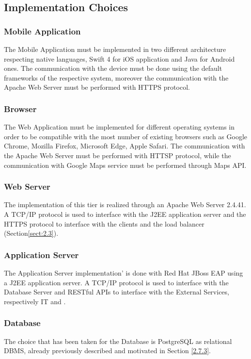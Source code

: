 \documentclass[../DD.tex]{subfiles}
\begin{document}
\subsection{Implementation Choices\label{5.2.2}}

\subsubsection{Mobile Application}
The Mobile Application must be implemented in two different architecture respecting native languages, Swift 4 for iOS application and Java for Android ones. The communication with the device must be done using the default frameworks of the respective system, moreover the communication with the Apache Web Server must be performed with HTTPS protocol.

\subsubsection{Browser}
The Web Application must be implemented for different operating systems in order to be compatible with the most number of existing browsers such as Google Chrome, Mozilla Firefox, Microsoft Edge, Apple Safari. The communication with the Apache Web Server must be performed with HTTSP protocol, while the communication with Google Maps service must be performed through Maps API.

\subsubsection{Web Server}
The implementation of this tier is realized through an Apache Web Server 2.4.41. A TCP/IP protocol is used to interface with the J2EE application server and the HTTPS protocol to interface with the clients and the load balancer (Section\ref{sect:2.3}). 

\subsubsection{Application Server}
The Application Server implementation' is done with Red Hat JBoss EAP using a J2EE application server. A TCP/IP protocol is used to interface with the Database Server and RESTful APIs to interface with the External Services, respectively  IT and  .

\subsubsection{Database}
The choice that has been taken for the Database is PostgreSQL as relational DBMS, already previously described and motivated in Section \ref{2.7.3}.
\end{document}
